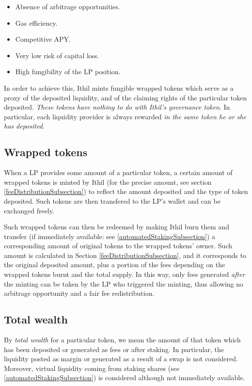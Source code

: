 \documentclass [10pt, fancyhdr, twoside] {article}
\begin{document}
\begin{itemize}
\item Absence of arbitrage opportunities.
\item Gas efficiency.
\item Competitive APY.
\item Very low risk of capital loss.
\item High fungibility of the LP position.
\end{itemize}

In order to achieve this, Ithil mints fungible wrapped tokens which serve as a proxy of the deposited liquidity, and of the claiming rights of the particular token deposited. \textit{These tokens have nothing to do with Ithil's governance token}. In particular, each liquidity provider is always rewarded \textit{in the same token he or she has deposited}.

\subsection{Wrapped tokens}\label{wrappedTokenSubsection}

When a LP provides some amount of a particular token, a certain amount of wrapped tokens is minted by Ithil (for the precise amount, see section \ref{feeDistributionSubsection}) to reflect the amount deposited and the type of token deposited. Such tokens are then transfered to the LP's wallet and can be exchanged freely.

Such wrapped tokens can then be redeemed by making Ithil burn them and transfer (if immediately available: see \ref{automatedStakingSubsection}) a corresponding amount of original tokens to the wrapped tokens' owner. Such amount is calculated in Section \ref{feeDistributionSubsection}, and it corresponds to the original deposited amount, plus a portion of the fees depending on the wrapped tokens burnt and the total supply. In this way, only fees generated \textit{after} the minting can be taken by the LP who triggered the minting, thus allowing no arbitrage opportunity and a fair fee redistribution.

\subsection{Total wealth}\label{totalWealthSubsection}

By \textit{total wealth} for a particular token, we mean the amount of that token which has been deposited or generated as fees or after staking. In particular, the liquidity posted as margin or generated as a result of a swap is not considered. Moreover, virtual liquidity coming from staking shares (see \ref{automatedStakingSubsection}) is considered although not immediately available.
\end{document}
